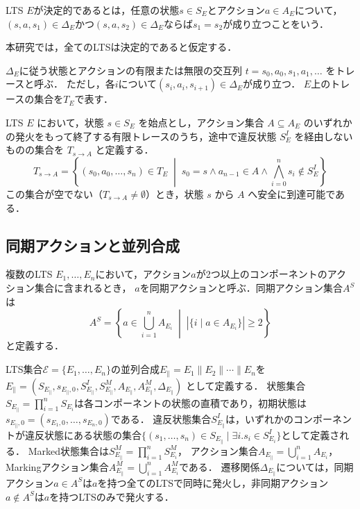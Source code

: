 \documentclass[a4paper,11pt,oneside,openany,report,dvipdfmx]{jsbook}
\begin{document}
\begin{definition}[決定性]
  LTS $E$が決定的であるとは，任意の状態$s\in S_E$とアクション$a\in A_E$について，
  $(s,a,s_1)\in\Delta_E$かつ$(s,a,s_2)\in\Delta_E$ならば$s_1=s_2$が成り立つことをいう．
\end{definition}

本研究では，全てのLTSは決定的であると仮定する．

\begin{definition}[トレース]
  $\Delta_E$に従う状態とアクションの有限または無限の交互列
  $t = s_0, a_0, s_1, a_1, \ldots$
  をトレースと呼ぶ．
  ただし，各$i$について$(s_i, a_i, s_{i+1}) \in \Delta_E$が成り立つ．
  $E$上のトレースの集合を$T_E$で表す．
\end{definition}

\begin{definition}[有効トレース集合]
  LTS $E$ において，状態 $s \in S_E$ を始点とし，アクション集合 $A \subseteq A_E$ のいずれかの発火をもって終了する有限トレースのうち，途中で違反状態 $S^I_E$ を経由しないものの集合を $T_{s \to A}$ と定義する．
  $$
    T_{s \to A} = \left\{
    (s_0, a_0, \dots, s_n) \in T_E \;\middle|\;
    s_0 = s \land a_{n-1} \in A \land \bigwedge_{i = 0}^n s_i \notin S^I_E
    \right\}
  $$
  この集合が空でない（$T_{s \to A} \neq \emptyset$）とき，状態 $s$ から $A$ へ安全に到達可能である．
\end{definition}

\subsection{同期アクションと並列合成}

\begin{definition}[同期アクション]
  複数のLTS $E_1, \ldots, E_n$において，アクション$a$が2つ以上のコンポーネントのアクション集合に含まれるとき，
  $a$を同期アクションと呼ぶ．同期アクション集合$A^S$は
  $$
    A^S = \left\{a \in \bigcup_{i=1}^{n} A_{E_i} \;\middle|\; |\{i \mid a \in A_{E_i}\}| \geq 2\right\}
  $$
  と定義する．
\end{definition}

\begin{definition}[並列合成]
  LTS集合$\mathcal{E} = \{E_1,\ldots,E_n\}$の並列合成$E_\parallel = E_1 \parallel E_2 \parallel \cdots \parallel E_n$を$E_\parallel = (S_{E_\parallel}, s_{E_\parallel ,0}, S^I_{E_\parallel}, S^M_{E_\parallel}, A_{E_\parallel}, A^M_{E_\parallel}, \Delta_{E_\parallel})$
  として定義する．
  状態集合$S_{E_\parallel}=\prod_{i=1}^{n}S_{E_i}$は各コンポーネントの状態の直積であり，初期状態は$s_{E_\parallel,0}=(s_{E_1,0},\ldots,s_{E_n,0})$である．
  違反状態集合$S^I_{E_\parallel}$は，いずれかのコンポーネントが違反状態にある状態の集合$\{(s_1, \ldots, s_n) \in S_{E_\parallel} \mid \exists i . s_i \in S^I_{E_i}\}$として定義される．
  Marked状態集合は$S^M_{E_\parallel}=\prod_{i=1}^{n}S^M_{E_i}$，
  アクション集合$A_{E_\parallel}=\bigcup_{i=1}^{n}A_{E_i}$，
  Markingアクション集合$A^M_{E_\parallel}=\bigcup_{i=1}^{n}A^M_{E_i}$である．
  遷移関係$\Delta_{E_\parallel}$については，同期アクション$a \in A^S$は$a$を持つ全てのLTSで同時に発火し，非同期アクション$a \notin A^S$は$a$を持つLTSのみで発火する．
\end{definition}
\end{document}
